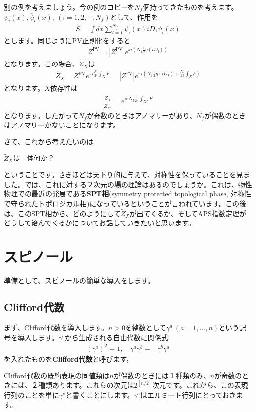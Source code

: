\documentclass[paper=a4, fontsize=12pt, line_length=16cm, number_of_lines=33,dvipdfmx]{jlreq}
\numberwithin{equation}{section}
\newcommand{\strong}[1]{\textsf{\bfseries #1}}
\newcommand{\psib}{\bar{\psi}}
\newcommand{\ZPV}{Z^{\mathrm{PV}}}
\newcommand{\Zt}{\widetilde{Z}}
\newenvironment{myquote}{\begin{tcolorbox}[
  colback = blue!5, after = \noindent] }{\end{tcolorbox}}
\begin{document}
別の例を考えましょう。今の例のコピーを$N_f$個持ってきたものを考えます。$\psi_i(x),\psib_i(x),\ (i=1,2,\cdots,N_f)$として、作用を
\begin{align}
  S=\int dx \sum_{i=1}^{N_f}\psib_i(x) iD_1 \psi_i(x)
\end{align}
とします。同じようにPV正則化をすると
\begin{align}
  \ZPV=|\ZPV|e^{\pi i(N_f \frac12\eta(iD_1))}
\end{align}
となります。この場合、$\Zt_X$は
\begin{align}
  \Zt_X=\ZPV e^{\pi i \frac{N_f}{2\pi}\int_X F}
  =|\ZPV|e^{\pi i(N_f \frac12\eta(iD_1)+\frac{N_f}{2\pi}\int_X F)}
\end{align}
となります。$X$依存性は
\begin{align}
  \frac{\Zt_{X}}{\Zt_{X'}}=e^{\pi i N_f \frac{1}{2\pi}\int_{X''}F}
\end{align}
となります。したがって$N_f$が奇数のときはアノマリーがあり、$N_f$が偶数のときはアノマリーがないことになります。

さて、これから考えたいのは
\begin{myquote}
  $\Zt_{X}$は一体何か？
\end{myquote}  
ということです。さきほどは天下り的に与えて、対称性を保っていることを見ました。では、これに対する２次元の場の理論はあるのでしょうか。これは、物性物理での最近の発展である\strong{SPT相}(symmetry protected topological phase, 対称性で守られたトポロジカル相)になっているということが言われています。この後は、このSPT相から、どのようにして$\Zt_{X}$が出てくるか、そしてAPS指数定理がどうして絡んでくるかについてお話していきたいと思います。

\section{スピノール}
準備として、スピノールの簡単な導入をします。

\subsection{Clifford代数}
まず、Clifford代数を導入します。$n>0$を整数として$\gamma^{a}\ (a=1,\dots,n)$という記号を導入します。$\gamma^a$から生成される自由代数に関係式
\begin{align}
  (\gamma^a)^2=1,\quad \gamma^a\gamma^b=-\gamma^b\gamma^a
\end{align}
を入れたものを\strong{Clifford代数}と呼びます。

Clifford代数の既約表現の同値類は$n$が偶数のときには１種類のみ、$n$が奇数のときには、２種類あります。これらの次元は$2^{[n/2]}$次元です。これから、この表現行列のことを単に$\gamma^{a}$と書くことにします。$\gamma^a$はエルミート行列にとっておきます。
\end{document}

